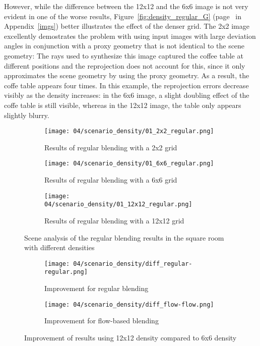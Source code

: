 However, while the difference between the 12x12 and the 6x6 image is not very evident in one of the worse results, Figure~\ref{fig:density_regular_G} (page~\pageref{fig:density_regular_G} in Appendix~\ref{imgs}) better illustrates the effect of the denser grid. The 2x2 image excellently demostrates the problem with using input images with large deviation angles in conjunction with a proxy geometry that is not identical to the scene geometry: The rays used to synthesize this image captured the coffee table at different positions and the reprojection does not account for this, since it only approximates the scene geometry by using the proxy geometry. As a result, the coffe table appears four times. In this example, the reprojection errors decrease visibly as the density increases: in the 6x6 image, a slight doubling effect of the coffe table is still visible, whereas in the 12x12 image, the table only appears slightly blurry.

\begin{figure}
\centering
    \hfill
    \begin{subfigure}[b]{0.32\textwidth}
            \centering
            \texttt{[image: 04/scenario\_density/01\_2x2\_regular.png]}
            \caption{Results of regular blending with a 2x2 grid}
    \end{subfigure}
    \hfill
    \begin{subfigure}[b]{0.32\textwidth}
            \centering
            \texttt{[image: 04/scenario\_density/01\_6x6\_regular.png]}
            \caption{Results of regular blending with a 6x6 grid}
    \end{subfigure}
    \hfill
    \begin{subfigure}[b]{0.32\textwidth}
            \centering
            \texttt{[image: 04/scenario\_density/01\_12x12\_regular.png]}
            \caption{Results of regular blending with a 12x12 grid}
    \end{subfigure}
    \hfill
  \caption{Scene analysis of the regular blending results in the square room with different densities} \label{fig:density_regular_scene_analysis}
\end{figure}

\begin{figure}
\centering
    \hfill
    \begin{subfigure}[b]{0.45\textwidth}
            \centering
            \texttt{[image: 04/scenario\_density/diff\_regular-regular.png]}
            \caption{Improvement for regular blending}
    \end{subfigure}
    \hfill
    \begin{subfigure}[b]{0.45\textwidth}
            \centering
            \texttt{[image: 04/scenario\_density/diff\_flow-flow.png]}
            \caption{Improvement for flow-based blending}
    \end{subfigure}
    \hfill
  \caption{Improvement of results using 12x12 density compared to 6x6 density} \label{fig:dens_diff_6x6_12x12}
\end{figure}


